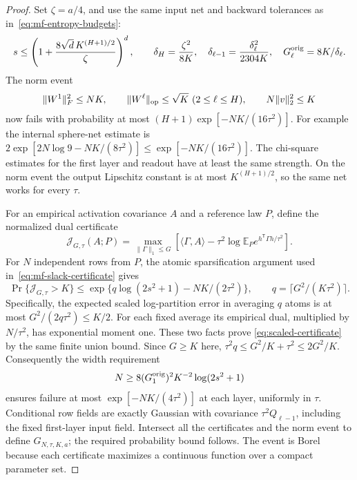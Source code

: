 \begin{proof}
Set $\zeta=a/4$, and use the same input net and backward tolerances
as in~\eqref{eq:mf-entropy-budgets}:
\[
 s\leq\left(1+\frac{8\sqrt d\,K^{(H+1)/2}}\zeta\right)^d,
 \qquad \delta_H=\frac{\zeta^2}{8K},\quad
 \delta_{\ell-1}=\frac{\delta_\ell^2}{2304K},\quad
 G_\ell^{\rm orig}=8K/\delta_\ell.
\]
The norm event
\[
 \|W^1\|_F^2\leq NK,\qquad
 \|W^\ell\|_{\rm op}\leq\sqrt K\ (2\leq\ell\leq H),\qquad
 N\|v\|_2^2\leq K
\]
now fails with probability at most
$(H+1)\exp[-NK/(16\tau^2)]$.
For example the internal sphere-net estimate is
$2\exp[2N\log9-NK/(8\tau^2)]
 \leq\exp[-NK/(16\tau^2)]$.
The chi-square estimates for the first layer and readout have at least
the same strength.  On the norm event the output Lipschitz constant
is at most $K^{(H+1)/2}$, so the same net works for every $\tau$.

For an empirical activation covariance $A$ and a reference law $P$,
define the normalized dual certificate
\[
 \mathcal J_{G,\tau}(A;P)=
 \max_{\|\Gamma\|_1\leq G}
 \left[\langle\Gamma,A\rangle-
       \tau^2\log\mathbb E_P e^{h^{\mathsf T}\Gamma h/\tau^2}\right].
\]
For $N$ independent rows from $P$, the atomic sparsification argument
used in~\eqref{eq:mf-slack-certificate} gives
\begin{equation}
 \Pr\{\mathcal J_{G,\tau}>K\}
 \leq\exp\{q\log(2s^2+1)-NK/(2\tau^2)\},
 \qquad q=\lceil G^2/(K\tau^2)\rceil.
 \label{eq:scaled-certificate}
\end{equation}
Specifically, the expected scaled log-partition error in averaging
$q$ atoms is at most $G^2/(2q\tau^2)\leq K/2$.
For each fixed average its empirical dual, multiplied by
$N/\tau^2$, has exponential moment one.  These two facts prove
\eqref{eq:scaled-certificate} by the same finite union bound.
Since $G\geq K$ here, $\tau^2q\leq G^2/K+\tau^2\leq2G^2/K$.
Consequently the width requirement
\[
 N\geq8(G_1^{\rm orig})^2K^{-2}\log(2s^2+1)
\]
ensures failure at most $\exp[-NK/(4\tau^2)]$ at each layer,
uniformly in $\tau$.  Conditional row fields are exactly Gaussian
with covariance $\tau^2Q_{\ell-1}$, including the fixed first-layer
input field.  Intersect all the certificates and the norm event to
define $G_{N,\tau,K,a}$; the required probability bound follows.
The event is Borel because each certificate maximizes a continuous
function over a compact parameter set.


\end{proof}
